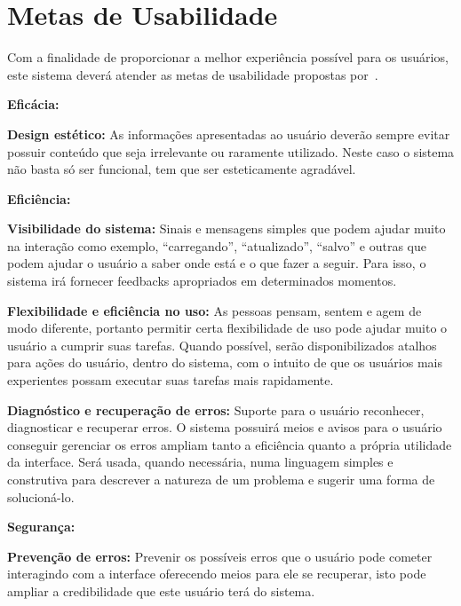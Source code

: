 \chapter[Metas de Usabilidade]{Metas de Usabilidade}

\noindent
Com a finalidade de proporcionar a melhor experiência possível para os usuários, este sistema deverá atender as metas de usabilidade propostas por~\cite{Nielsen}.

\vspace{0.2cm}
\textbf{Eficácia:}

\hspace{1.3cm}
\textbf{Design estético:} As informações apresentadas ao usuário deverão sempre evitar possuir conteúdo que seja irrelevante ou raramente utilizado. Neste caso o sistema não basta só ser funcional, tem que ser esteticamente agradável.

\vspace{0.4cm}
\textbf{Eficiência:}

\hspace{1.3cm}
\textbf{Visibilidade do sistema:} Sinais e mensagens simples que podem ajudar muito na interação como exemplo, “carregando”, “atualizado”, “salvo” e outras que podem ajudar o usuário a saber onde está e o que fazer a seguir. Para isso, o sistema irá fornecer feedbacks apropriados em determinados momentos.

\hspace{1.3cm}
\textbf{Flexibilidade e eficiência no uso:} As pessoas pensam, sentem e agem de modo diferente, portanto permitir certa flexibilidade de uso pode ajudar muito o usuário a cumprir suas tarefas. Quando possível, serão disponibilizados atalhos para ações do usuário, dentro do sistema, com o intuito de que os usuários mais experientes possam executar suas tarefas mais rapidamente. 

\hspace{1.3cm}
\textbf{Diagnóstico e recuperação de erros:} Suporte para o usuário reconhecer, diagnosticar e recuperar erros. O sistema possuirá meios e avisos para o usuário conseguir gerenciar os erros ampliam tanto a eficiência quanto a própria utilidade da interface. Será usada, quando necessária, numa linguagem simples e construtiva para descrever a natureza de um problema e sugerir uma forma de solucioná-lo.

\vspace{0.4cm}
\textbf{Segurança:}

\hspace{1.3cm}
\textbf{Prevenção de erros:} Prevenir os possíveis erros que o usuário pode cometer interagindo com a interface oferecendo meios para ele se recuperar, isto pode ampliar a credibilidade que este usuário terá do sistema.

